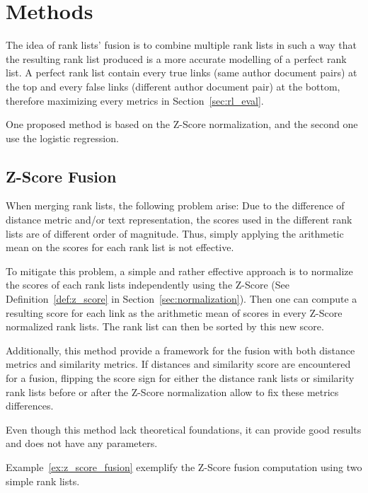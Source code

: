 \section{Methods \label{sec:rank_lists_fusion}}

The idea of rank lists' fusion is to combine multiple rank lists in such a way that the resulting rank list produced is a more accurate modelling of a perfect rank list.
A perfect rank list contain every true links (same author document pairs) at the top and every false links (different author document pair) at the bottom, therefore maximizing every metrics in Section~\ref{sec:rl_eval}.

One proposed method is based on the Z-Score normalization, and the second one use the logistic regression.

\subsection{Z-Score Fusion}

When merging rank lists, the following problem arise: Due to the difference of distance metric and/or text representation, the scores used in the different rank lists are of different order of magnitude.
Thus, simply applying the arithmetic mean on the scores for each rank list is not effective.

To mitigate this problem, a simple and rather effective approach is to normalize the scores of each rank lists independently using the Z-Score (See Definition~\ref{def:z_score} in Section~\ref{sec:normalization}).
Then one can compute a resulting score for each link as the arithmetic mean of scores in every Z-Score normalized rank lists.
The rank list can then be sorted by this new score.

Additionally, this method provide a framework for the fusion with both distance metrics and similarity metrics.
If distances and similarity score are encountered for a fusion, flipping the score sign for either the distance rank lists or similarity rank lists before or after the Z-Score normalization allow to fix these metrics differences.

Even though this method lack theoretical foundations, it can provide good results and does not have any parameters.

Example~\ref{ex:z_score_fusion} exemplify the Z-Score fusion computation using two simple rank lists.

